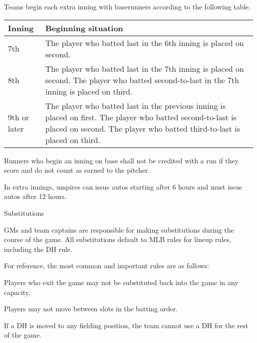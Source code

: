 \begin{deepEnumerate}
	\begin{deepEnumerate}
		\item Teams begin each extra inning with baserunners according to the following table.
		\begin{center}										                
			\begin{longtable}{|p{3cm}|p{8cm}|}
				\hline
				\textbf{Inning} & \textbf{Beginning situation}                                          \\
				\hline
				7th             & The player who batted last in the 6th inning is placed on second.     \\
				\hline
				8th             & The player who batted last in the 7th inning is placed on second.     
				The player who batted second-to-last in the 7th inning is placed on third. \\
				\hline
				9th or later    & The player who batted last in the previous inning is placed on first. 
				The player who batted second-to-last is placed on second.
				The player who batted third-to-last is placed on third. \\
				\hline
			\end{longtable}
		\end{center}
		\item Runners who begin an inning on base shall not be credited with a run if they score and
		do not count as earned to the pitcher.
		\item In extra innings, umpires can issue autos starting after 6 hours and must issue autos after 12 hours.
	\end{deepEnumerate}
	\item Substitutions
	\label{sec:substitutions}
	\begin{deepEnumerate}
		\item GMs and team captains are responsible for making substitutions during the course of the game.
		All substitutions default to MLB rules for lineup rules, including the DH rule.
		\begin{deepEnumerate}
			\item For reference, the most common and important rules are as follows:
			\begin{deepEnumerate}
				\item Players who exit the game may not be substituted back into the game in any capacity.
				\item Players may not move between slots in the batting order.
				\item If a DH is moved to any fielding position, the team cannot use a DH for the rest of the game. 

\end{deepEnumerate}
\end{deepEnumerate}
\end{deepEnumerate}
\end{deepEnumerate}
